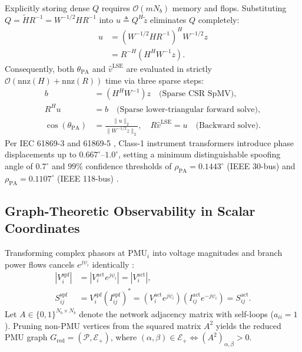 \documentclass[journal,twoside]{IEEEtran}
\begin{document}
Explicitly storing dense $Q$ requires $\mathcal{O}(m N_b)$ memory and flops. Substituting $Q = \tilde{H} R^{-1} = W^{-1/2} H R^{-1}$ into $u \triangleq Q^H \tilde{z}$ eliminates $Q$ completely:
\begin{equation}
\begin{aligned}
u &= \left(W^{-1/2} H R^{-1}\right)^H W^{-1/2} z \\
&= R^{-H}\left(H^H W^{-1} z\right).
\end{aligned}
\label{eq:u_deriv}
\end{equation}
Consequently, both $\theta_{\mathrm{PA}}$ and $\hat{v}^{\mathrm{LSE}}$ are evaluated in strictly $\mathcal{O}(\mathrm{nnz}(H) + \mathrm{nnz}(R))$ time via three sparse steps:
\begin{align}
b &= \left(H^H W^{-1}\right) z \quad \text{(Sparse CSR SpMV)}, \label{eq:sp_step1} \\
R^H u &= b \quad \text{(Sparse lower-triangular forward solve)}, \label{eq:sp_step2} \\
\cos(\theta_{\mathrm{PA}}) &= \frac{\|u\|_2}{\|W^{-1/2}z\|_2}, \quad R\hat{v}^{\mathrm{LSE}} = u \quad \text{(Backward solve)}. \label{eq:sp_step3}
\end{align}
Per IEC 61869-3 and 61869-5 \cite{iec61869}, Class-1 instrument transformers introduce phase displacements up to $0.667^\circ\text{--}1.0^\circ$, setting a minimum distinguishable spoofing angle of $0.7^\circ$ and $99\%$ confidence thresholds of $\rho_{\mathrm{PA}} = 0.1443^\circ$ (IEEE 30-bus) and $\rho_{\mathrm{PA}} = 0.1107^\circ$ (IEEE 118-bus) \cite{badugu2026synchrophasor}.

\subsection{Graph-Theoretic Observability in Scalar Coordinates}
Transforming complex phasors at $\mathrm{PMU}_i$ into voltage magnitudes and branch power flows cancels $e^{j\psi_i}$ identically \cite{badugu2026synchrophasor}:
\begin{equation}
\begin{aligned}
\left|V_i^{\mathrm{spf}}\right| &= \left|V_i^{\mathrm{act}} e^{j\psi_i}\right| = \left|V_i^{\mathrm{act}}\right|, \\
S_{ij}^{\mathrm{spf}} &= V_i^{\mathrm{spf}}\left(I_{ij}^{\mathrm{spf}}\right)^* = \left(V_i^{\mathrm{act}}e^{j\psi_i}\right)\left(I_{ij}^{\mathrm{act}}e^{-j\psi_i}\right) = S_{ij}^{\mathrm{act}}.
\end{aligned}
\label{eq:scalar_invariance}
\end{equation}
Let $A \in \{0, 1\}^{N_b \times N_b}$ denote the network adjacency matrix with self-loops ($a_{ii} = 1$). Pruning non-PMU vertices from the squared matrix $A^2$ yields the reduced PMU graph $G_{\mathrm{red}} = (\mathcal{P}, \mathcal{E}_+)$, where $(\alpha, \beta) \in \mathcal{E}_+ \iff (A^2)_{\alpha,\beta} > 0$.
\end{document}
